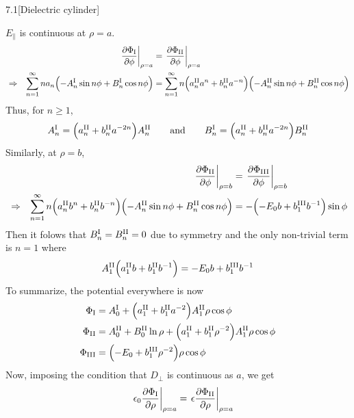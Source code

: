 \documentclass[12pt]{article}
\begin{document}
\begin{problem}{7.1}[Dielectric cylinder]
\begin{solution}
$E_\parallel$ is continuous at $\rho=a$.
\begin{align}
    &&\eval{\frac{\partial\Phi_{\RN{1}}}{\partial\phi}}_{\rho=a} 
    &=\eval{\frac{\partial\Phi_{\RN{2}}}{\partial\phi}}_{\rho=a} \notag\\
    &\Rightarrow&
    \sum_{n=1}^\infty na_n\qty(-A_n^{\RN{1}}\sin n\phi+B_n^{\RN{1}}\cos n\phi)
    &=\sum_{n=1}^\infty n\qty(a_n^{\RN{2}}a^n+b_n^{\RN{2}}a^{-n})
    \qty(-A_n^{\RN{2}}\sin n\phi+B_n^{\RN{2}}\cos n\phi)
\end{align}
Thus, for $n\geq 1$,
\begin{equation}
    A_n^{\RN{1}}=\qty(a_n^{\RN{2}}+b_n^{\RN{2}}a^{-2n})A_n^{\RN{2}} 
    \qquad\text{and}\qquad
    B_n^{\RN{1}}=\qty(a_n^{\RN{2}}+b_n^{\RN{2}}a^{-2n})B_n^{\RN{2}} 
\end{equation}
Similarly, at $\rho=b$,
\begin{align}
    &&\eval{\frac{\partial\Phi_{\RN{2}}}{\partial\phi}}_{\rho=b} 
    &=\eval{\frac{\partial\Phi_{\RN{3}}}{\partial\phi}}_{\rho=b} \notag\\
    &\Rightarrow&
    \sum_{n=1}^\infty n\qty(a_n^{\RN{2}}b^n+b_n^{\RN{2}}b^{-n})
    \qty(-A_n^{\RN{2}}\sin n\phi+B_n^{\RN{2}}\cos n\phi)
    &=-\qty(-E_0b+b_1^{\RN{3}}b^{-1})\sin\phi
\end{align}
Then it folows that $B_n^{\RN{1}}=B_n^{\RN{2}}=0$ due to symmetry and the only
non-trivial term is $n=1$ where
\begin{equation}\label{p1:A12}
    A_1^{\RN{2}}\qty(a_1^{\RN{2}}b+b_1^{\RN{2}}b^{-1})=-E_0b+b_1^{\RN{3}}b^{-1} 
\end{equation}
To summarize, the potential everywhere is now
\begin{subequations}
    \begin{align}
        \Phi_{\RN{1}}
        &=A_0^{\RN{1}}+\qty(a_1^{\RN{2}}+b_1^{\RN{2}}a^{-2})A_1^{\RN{2}}\rho\cos\phi\\
        \Phi_{\RN{2}}
        &=A_0^{\RN{2}}+B_0^{\RN{2}}\ln\rho+\qty(a_1^{\RN{2}}+b_1^{\RN{2}}\rho^{-2})A_1^{\RN{2}}\rho\cos\phi\\
        \Phi_{\RN{3}}
        &=\qty(-E_0+b_1^{\RN{3}}\rho^{-2})\rho\cos\phi
    \end{align} 
\end{subequations}
Now, imposing the condition that $D_\bot$ is continuous as $a$, we get
\begin{align}
    &&\eval{\epsilon_0\frac{\partial\Phi_{\RN{1}}}{\partial\rho}}_{\rho=a} 
    &=\eval{\epsilon\frac{\partial\Phi_{\RN{2}}}{\partial\rho}}_{\rho=a}\notag\\

\end{align}
\end{solution}
\end{problem}
\end{document}
